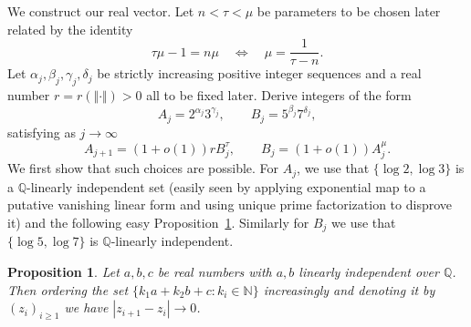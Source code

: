 \documentclass[10pt]{amsart}
\newtheorem{proposition}{Proposition}
\theoremstyle{definition}
\newcommand{\Q}{\mathbb{Q}}
\begin{document}
We construct our real vector. 
Let $n<\tau<\mu$ be parameters to be chosen later related by the identity
\begin{equation} \label{eq:IIi}
\tau \mu-1=n\mu \quad \Longleftrightarrow \quad \mu=\frac{1}{\tau-n}.
\end{equation}
Let $\alpha_j, \beta_j, \gamma_j, \delta_j$ be strictly increasing positive integer sequences and a real number $r=r(\Vert\cdot\Vert)>0$ all to be fixed later. 
Derive integers of the form
\[
A_j= 2^{\alpha_j}3^{\gamma_j }, \qquad B_j= 5^{\beta_j }7^{\delta_j},
\]
satisfying as $j\to\infty$
\begin{equation} \label{eq:accto}
A_{j+1}= (1+o(1))r B_j^{\tau}, \qquad B_j = (1+o(1))A_j^{\mu}.
\end{equation}
We first show that such choices are possible. For $A_j$, we use that $\{ \log 2, \log 3\}$ is a $\Q$-linearly independent set (easily seen by applying exponential map to a putative vanishing linear form and using unique prime factorization to disprove it) and the following easy Proposition~\ref{proper}. Similarly 
for $B_j$ we use that $\{ \log 5, \log 7\}$ is $\Q$-linearly independent.

\begin{proposition}  \label{proper}
	Let $a,b,c$ be real numbers with $a,b$ linearly independent over $\Q$. Then ordering 
	the set $\{ k_1 a+k_2 b+c: k_i\in\mathbb{N} \}$ increasingly and denoting
	it by $(z_i)_{i\ge 1}$ we have $|z_{i+1}-z_i|\to 0$.
\end{proposition}
\end{document}
